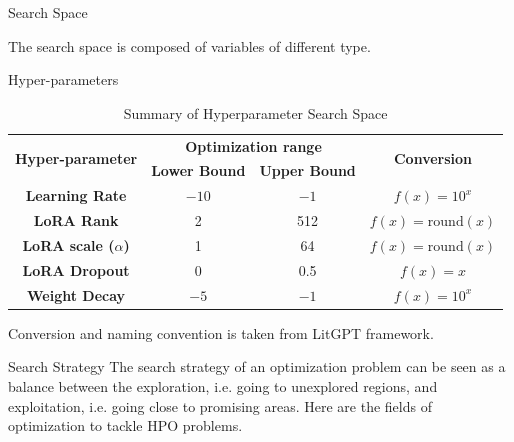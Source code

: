 \begin{frame}{Search Space}

    The search space is composed of variables of different type.

    \begin{block}{Hyper-parameters}
    
        \begin{table}[h!]
            \centering
            \begin{tabular}{|c|c|c|c|}
                \hline
                \multirow{2}{*}{\textbf{Hyper-parameter}} & \multicolumn{2}{|c|}{\textbf{Optimization range}} & \multirow{2}{*}{\textbf{Conversion}} \\
                \cline{2-3}
                 & \textbf{Lower Bound} & \textbf{Upper Bound} &  \\
                \hline
                \textbf{Learning Rate} & $-10$ & $-1$ & $f(x) = 10^{x}$ \\
                \hline
                \textbf{LoRA Rank} & 2 & 512 & $f(x) = \text{round}(x)$ \\
                \hline
                \textbf{LoRA scale ($\alpha$)} & 1 & 64 & $f(x) = \text{round}(x)$ \\
                \hline
                \textbf{LoRA Dropout} & 0 & 0.5 & $f(x) = x$ \\
                \hline
                \textbf{Weight Decay} & $-5$ & $-1$ & $f(x) = 10^{x}$  \\
                \hline
            \end{tabular}
            \caption{Summary of Hyperparameter Search Space}
            \label{tab:hyperparam_table}
        \end{table}
        
    \end{block}
    
    Conversion and naming convention is taken from LitGPT framework.
\end{frame}


\begin{frame}[allowframebreaks]{Search Strategy}
    The search strategy of an optimization problem can be seen as a balance between the exploration, i.e. going to unexplored regions, and exploitation, i.e. going close to promising areas. Here are the fields of optimization to tackle HPO problems.

\end{frame}


